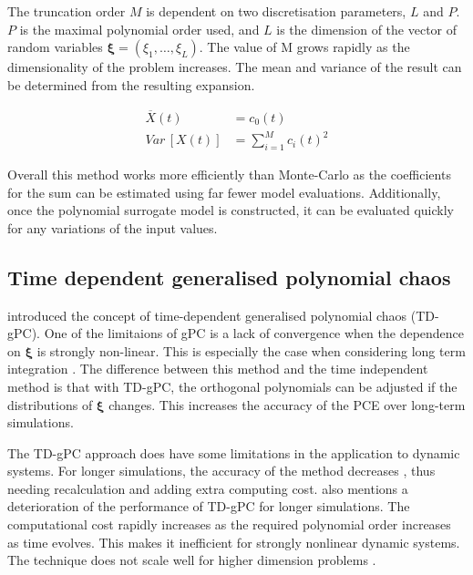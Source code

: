 The truncation order \(M\) is dependent on two discretisation parameters, \(L\) and \(P\). \(P\) is the maximal polynomial order
used, and \(L\) is the dimension of the vector of random variables \(\boldsymbol{\xi} = (\xi_1, \dots, \xi_L)\). The value of M
grows rapidly as the dimensionality of the problem increases. The mean and variance of the result can be determined from
the resulting expansion. 

\begin{align}
    \overbar{X}(t) &= c_0(t) \\
    \mathit{Var} \, \left[ X(t) \right] &= \sum_{i = 1}^{M} c_i(t)^2
\end{align}

Overall this method works more efficiently than Monte-Carlo as the coefficients for the sum can be estimated using far
fewer model evaluations. Additionally, once the polynomial surrogate model is constructed, it can be evaluated quickly
for any variations of the input values. 

\subsection{Time dependent generalised polynomial chaos}
\textcite{gerritsmaTimedependentGeneralizedPolynomial2010} introduced the concept of time-dependent generalised
polynomial chaos (TD-gPC). One of the limitaions of gPC is a lack of convergence when the dependence on \(\boldsymbol{\xi}\) is
strongly non-linear. This is especially the case when considering long term integration
\parencite{heuvelineHybridGeneralizedPolynomial2014}. The difference between this method and the time independent method
is that with TD-gPC, the orthogonal polynomials can be adjusted if the distributions of \( \boldsymbol{\xi} \) changes.
This increases the accuracy of the PCE over long-term simulations. 

The TD-gPC approach does have some limitations in the application to dynamic systems. For longer simulations, the
accuracy of the method decreases \parencite{gerritsmaTimedependentGeneralizedPolynomial2010}, thus needing recalculation
and adding extra computing cost. \textcite{ebadollahiTimedependentUncertaintyQuantification2025} also mentions a
deterioration of the performance of TD-gPC for longer simulations. The computational cost rapidly increases as the
required polynomial order increases as time evolves. This makes it inefficient for strongly nonlinear dynamic systems.
The technique does not scale well for higher dimension problems
\parencites{heuvelineHybridGeneralizedPolynomial2014}{maiSurrogateModellingStochastic2016}. 


